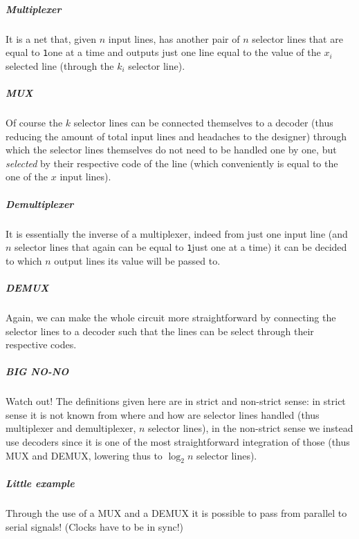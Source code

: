 \documentclass{scrartcl}
\newcommand{\one}{\texttt{1}}
\begin{document}
    \subparagraph{Multiplexer} It is a net that, given $n$ input lines, has another pair of $n$ selector lines that are equal to \one one at a time and outputs just one line equal to the value of the $x_i$ selected line (through the $k_i$ selector line).
    \subparagraph{MUX} Of course the $k$ selector lines can be connected themselves to a decoder (thus reducing the amount of total input lines and headaches to the designer) through which the selector lines themselves do not need to be handled one by one, but \emph{selected} by their respective code of the line (which conveniently is equal to the one of the $x$ input lines).
    \subparagraph{Demultiplexer} It is essentially the inverse of a multiplexer, indeed from just one input line (and $n$ selector lines that again can be equal to \one just one at a time) it can be decided to which $n$ output lines its value will be passed to.
    \subparagraph{DEMUX} Again, we can make the whole circuit more straightforward by connecting the selector lines to a decoder such that the lines can be select through their respective codes.
    \subparagraph{BIG NO-NO} Watch out! The definitions given here are in strict and non-strict sense: in strict sense it is not known from where and how are selector lines handled (thus multiplexer and demultiplexer, $n$ selector lines), in the non-strict sense we instead use decoders since it is one of the most straightforward integration of those (thus MUX and DEMUX, lowering thus to $\log_2{n}$ selector lines).
    \subparagraph{Little example} Through the use of a MUX and a DEMUX it is possible to pass from parallel to serial signals! (Clocks have to be in sync!)
\end{document}
